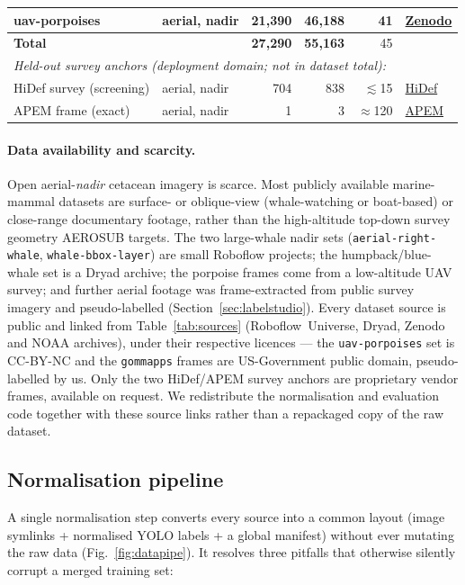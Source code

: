 \documentclass[11pt,a4paper]{article}
\begin{document}
\begin{table}[t]
\begin{tabular}{llrrrl}
uav-porpoises        & aerial, nadir   & 21{,}390 & 46{,}188 & 41 & \href{https://zenodo.org/records/13267979}{Zenodo} \\
\midrule
\textbf{Total}       &                 & \textbf{27{,}290} & \textbf{55{,}163} & 45 & \\
\midrule
\multicolumn{6}{l}{\emph{Held-out survey anchors (deployment domain; not in dataset total):}}\\
HiDef survey (screening) & aerial, nadir & 704 & 838 & $\lesssim$15 & \href{https://www.hidefsurveying.co.uk/}{HiDef} \\
APEM frame (exact)       & aerial, nadir & 1   & 3   & $\approx$120 & \href{https://www.apemltd.com/}{APEM} \\
\bottomrule
\end{tabular}
\end{table}

\paragraph{Data availability and scarcity.}
Open aerial-\emph{nadir} cetacean imagery is scarce. Most publicly available
marine-mammal datasets are surface- or oblique-view (whale-watching or
boat-based) or close-range documentary footage, rather than the high-altitude
top-down survey geometry AEROSUB targets. The two large-whale nadir sets
(\texttt{aerial-right-whale}, \texttt{whale-bbox-layer}) are small Roboflow
projects; the humpback/blue-whale set is a Dryad archive; the porpoise frames
come from a low-altitude UAV survey; and further aerial footage was
frame-extracted from public survey imagery and pseudo-labelled
(Section~\ref{sec:labelstudio}). Every dataset source is public and linked from
Table~\ref{tab:sources} (Roboflow~Universe, Dryad, Zenodo and NOAA archives),
under their respective licences --- the \texttt{uav-porpoises} set is CC-BY-NC
and the \texttt{gommapps} frames are US-Government public domain, pseudo-labelled
by us. Only the two HiDef/APEM survey anchors are proprietary vendor frames,
available on request. We redistribute the normalisation and evaluation code
together with these source links rather than a repackaged copy of the raw
dataset.

\subsection{Normalisation pipeline}
A single normalisation step converts every source into a
common layout (image symlinks + normalised YOLO labels + a global
manifest) without ever mutating the raw data
(Fig.~\ref{fig:datapipe}). It resolves three
pitfalls that otherwise silently corrupt a merged training set:
\end{document}
